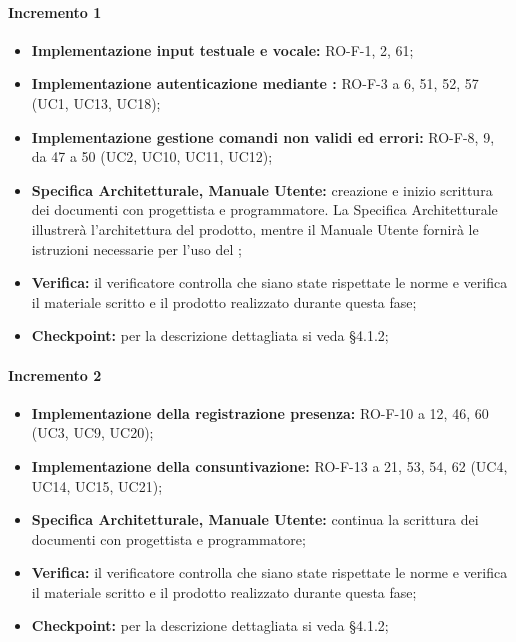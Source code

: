 \paragraph{Incremento 1}
\begin{itemize}
    \item \textbf{Implementazione input testuale e vocale:} RO-F-1, 2, 61;
    \item \textbf{Implementazione autenticazione mediante :} RO-F-3 a 6, 51, 52, 57 (UC1, UC13, UC18);
    \item \textbf{Implementazione gestione comandi non validi ed errori:} RO-F-8, 9, da 47 a 50 (UC2, UC10, UC11, UC12);
    \item \textbf{Specifica Architetturale, Manuale Utente:} creazione e inizio scrittura dei documenti con progettista e programmatore. La Specifica Architetturale illustrerà l'architettura del prodotto, mentre il Manuale Utente fornirà le istruzioni necessarie per l'uso del ;
    \item \textbf{Verifica:} il verificatore controlla che siano state rispettate le norme e verifica il materiale scritto e il prodotto realizzato durante questa fase;
    \item \textbf{Checkpoint:} per la descrizione dettagliata si veda §4.1.2;
\end{itemize}

\paragraph{Incremento 2}
\begin{itemize}
    \item \textbf{Implementazione della registrazione presenza:} RO-F-10 a 12, 46, 60 (UC3, UC9, UC20);
    \item \textbf{Implementazione della consuntivazione:} RO-F-13 a 21, 53, 54, 62 (UC4, UC14, UC15, UC21);
    \item \textbf{Specifica Architetturale, Manuale Utente:} continua la scrittura dei documenti con progettista e programmatore;
    \item \textbf{Verifica:} il verificatore controlla che siano state rispettate le norme e verifica il materiale scritto e il prodotto realizzato durante questa fase;
    \item \textbf{Checkpoint:} per la descrizione dettagliata si veda §4.1.2;
\end{itemize}


